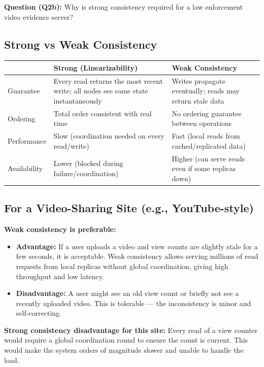 \documentclass[12pt,a4paper]{article}
\begin{document}
\textbf{Question (Q2b):} Why is strong consistency required for a law enforcement video evidence server?

\subsection*{Strong vs Weak Consistency}

\begin{center}
\begin{tabular}{@{}p{3.5cm}p{5cm}p{5cm}@{}}
\toprule
 & \textbf{Strong (Linearizability)} & \textbf{Weak Consistency} \\
\midrule
Guarantee & Every read returns the most recent write; all nodes see same state instantaneously & Writes propagate eventually; reads may return stale data \\
Ordering & Total order consistent with real time & No ordering guarantee between operations \\
Performance & Slow (coordination needed on every read/write) & Fast (local reads from cached/replicated data) \\
Availability & Lower (blocked during failure/coordination) & Higher (can serve reads even if some replicas down) \\
\bottomrule
\end{tabular}
\end{center}

\subsection*{For a Video-Sharing Site (e.g., YouTube-style)}

\textbf{Weak consistency is preferable:}
\begin{itemize}[noitemsep]
  \item \textbf{Advantage:} If a user uploads a video and view counts are slightly stale for a few seconds, it is acceptable. Weak consistency allows serving millions of read requests from local replicas without global coordination, giving high throughput and low latency.
  \item \textbf{Disadvantage:} A user might see an old view count or briefly not see a recently uploaded video. This is tolerable --- the inconsistency is minor and self-correcting.
\end{itemize}

\textbf{Strong consistency disadvantage for this site:} Every read of a view counter would require a global coordination round to ensure the count is current. This would make the system orders of magnitude slower and unable to handle the load.
\end{document}
